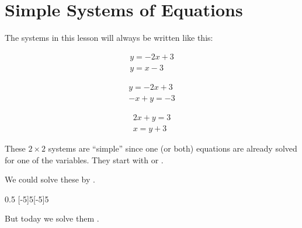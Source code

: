 \section{Simple Systems of Equations}

The systems in this lesson will always be written like this:

\begin{minipage}{0.3\textwidth}
    \begin{align*}
        y = -2x + 3 \\
        y = x-3
    \end{align*}    
\end{minipage}
\begin{minipage}{0.3\textwidth}
    \begin{align*}
        y = -2x + 3 \\
        -x+y = -3
    \end{align*}    
\end{minipage}
\begin{minipage}{0.3\textwidth}
    \begin{align*}
        2x + y = 3 \\
        x = y+3
    \end{align*}    
\end{minipage}

\begin{tcolorbox}[center,width=4in]
    These $2\times2$ systems are ``simple'' since one (or both) equations are already solved
    for one of the variables.
    They start with  
     or .
\end{tcolorbox}
We could solve these by .

\begin{center}
    \begin{myTikzpictureGrid}{0.5} [-5]{5}[-5]{5}
        \end{myTikzpictureGrid}
\end{center}
%
But today we solve them 
.
